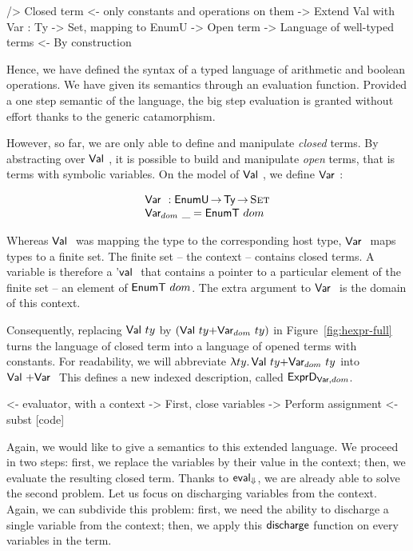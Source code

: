 \begin{wstructure}
    /> Closed term
        <- only constants and operations on them
        -> Extend Val with Var : Ty -> Set, mapping to EnumU
            -> Open term
            -> Language of well-typed terms
                <- By construction
\end{wstructure}

Hence, we have defined the syntax of a typed language of arithmetic
and boolean operations. We have given its semantics through an
evaluation function. Provided a one step semantic of the language, the
big step evaluation is granted without effort thanks to the generic
catamorphism. 

However, so far, we are only able to define and manipulate
\emph{closed} terms. By abstracting over $\Val{}$, it is possible to
build and manipulate \emph{open} terms, that is terms with symbolic
variables. On the model of $\Val{}$, we define $\Var{}{}$:

\[\stk{
\Var{}{} : \EnumU \To \Ty \To \Set \\
\Var{dom}{\_} = \EnumT{dom}
}\]

Whereas $\Val{}$ was mapping the type to the corresponding host type,
$\Var{}{}$ maps types to a finite set. The finite set -- the context
-- contains closed terms. A variable is therefore a $\Eval{}$ that
contains a pointer to a particular element of the finite set -- an
element of $\EnumT{dom}$. The extra argument to $\Var{}{}$ is the
domain of this context.

Consequently, replacing $\Val{ty}$ by
$(\SUM{\Val{ty}}{\Var{dom}{ty}})$ in Figure~\ref{fig:hexpr-full} turns
the language of closed term into a language of opened terms with
constants. For readability, we will abbreviate $\LAM{ty}
\SUM{\Val{ty}}{\Var{dom}{ty}}$ into $\SUM{\Val{}}{\Var{}{}}$  This defines a new
indexed description, called $\HExprVarD{dom}$.

\begin{wstructure}
        <- evaluator, with a context
            -> First, close variables
                -> Perform assignment
                <- subst [code]
\end{wstructure}

\newcommand{\discharge}{\F{discharge}}

Again, we would like to give a semantics to this extended language. We
proceed in two steps: first, we replace the variables by their value
in the context; then, we evaluate the resulting closed term. Thanks to
$\evalH$, we are already able to solve the second problem. Let us
focus on discharging variables from the context. Again, we can
subdivide this problem: first, we need the ability to discharge a
single variable from the context; then, we apply this $\discharge$
function on every variables in the term.

